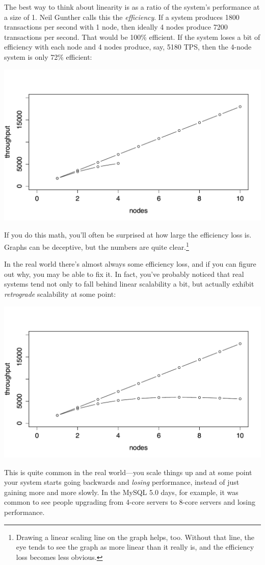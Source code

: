 \documentclass{vivid_layout}
\begin{document}
The best way to think about linearity is as a ratio of the system's performance
at a size of 1. Neil Gunther calls this the {\itshape efficiency}.
If a system produces 1800 transactions per second with 1 node, then ideally 4
nodes produce 7200 transactions per second. That would be 100\% efficient. If
the system loses a bit of efficiency with each node and 4 nodes produce, say,
5180 TPS, then the 4-node system is only 72\% efficient:
\begin{center}
\includegraphics[width=.85\linewidth]{scalability/linear2}
\end{center}
If you do this math, you'll often be surprised at how large the 
efficiency loss is.  Graphs can be deceptive, but the numbers are quite
clear.\footnote{Drawing a linear scaling line on the graph helps, too. Without
that line, the eye tends to see the graph as more linear than it really is, and
the efficiency loss becomes less obvious.}


In the real world there's almost always some efficiency loss, and if you can
figure out why, you may be able to fix it. In fact, you've probably noticed that
real systems tend not only to fall behind linear scalability a bit, but actually
exhibit {\itshape retrograde} scalability at some point:
\begin{center}
\includegraphics[width=.85\linewidth]{scalability/linear3}
\end{center}
This is quite common in the real world---you scale things up and at some point
your system starts going backwards and {\itshape losing} performance, instead of
just gaining more and more slowly. In the MySQL 5.0 days, for example, it was
common to see people upgrading from 4-core servers to 8-core servers and losing
performance.
\end{document}
